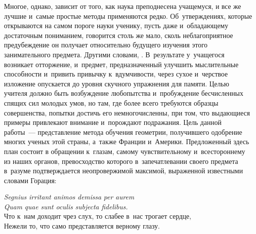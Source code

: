 \documentclass[letters]{byrne-book}
\begin{document}
Многое, однако, зависит от того, как наука преподнесена учащемуся, и все же лучшие и~самые простые методы применяются редко. Об~утверждениях, которые открываются на самом пороге науки ученику, пусть даже и~обладающему достаточным пониманием, говорится столь же мало, сколь неблагоприятное  предубеждение он получает относительно будущего изучения этого занимательного предмета. Другими словами, . В~результате у~учащегося возникает отторжение, и~предмет, предназначенный улучшить мыслительные способности и~привить привычку к~вдумчивости, через сухое и~черствое изложение опускается до уровня скучного упражнения для памяти. Целью учителя должно быть возбуждение любопытства и~пробуждение бесчисленных спящих сил молодых умов, но там, где более всего требуются образцы совершенства, попытки достичь его немногочисленны, при том, что выдающиеся примеры привлекают внимание и~порождают подражания. Цель данной работы~— представление метода обучения геометрии, получившего одобрение многих ученых этой страны, а~также Франции и~Америки. Предложенный здесь план состоит в обращении к~глазам, самому чувствительному и~всестороннему из наших органов, превосходство которого в~запечатлевании своего предмета в~разуме подтверждается неопровержимой максимой, выраженной известными словами Горация:

\vfill

\begin{center}
\emph{Segnius irritant animos demissa per aurem\\
Quam quae sunt oculis subjecta fidelibus.}\\
Что к~нам доходит чрез слух, то слабее в~нас трогает сердце,\\
Нежели то, что само представляется верному глазу. %
\end{center}
\end{document}
